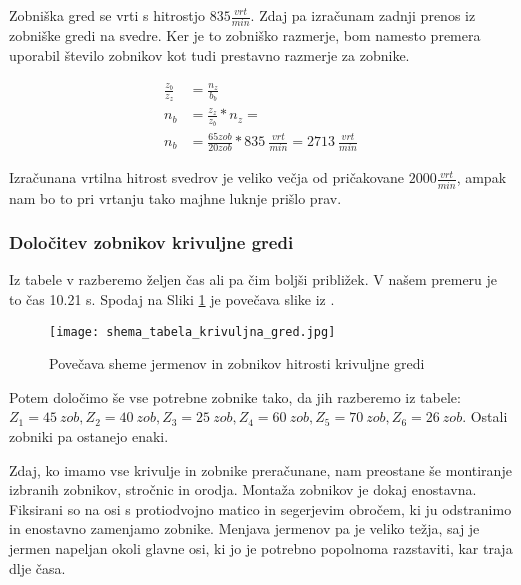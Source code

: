 Zobniška gred se vrti s hitrostjo \(835 \frac{vrt}{min}\). Zdaj pa izračunam
zadnji prenos iz zobniške gredi na svedre. Ker je to zobniško razmerje, bom namesto
premera uporabil število zobnikov kot tudi prestavno razmerje za zobnike.

\begin{equation}
	\label{eq:12}
	\begin{split}
		\frac{z_b}{z_z} &= \frac{n_z}{b_b} \\
		n_b &= \frac{z_z}{z_b} * n_z = \\
		n_b &= \frac{65 zob}{20 zob} * 835\ \frac{vrt}{min} = 2713\ \frac{vrt}{min}
	\end{split}
\end{equation}

Izračunana vrtilna hitrost svedrov je veliko večja od pričakovane \(2000\frac{vrt}{min}\),
ampak nam bo to pri vrtanju tako majhne luknje prišlo prav.

\subsubsection{Določitev zobnikov krivuljne gredi}

Iz tabele v  razberemo željen čas
ali pa čim boljši približek. V našem premeru je to čas 10.21 s.
Spodaj na Sliki \ref{povecava} je povečava slike iz .
\begin{figure}[H]
	\begin{center}
		\texttt{[image: shema\_tabela\_krivuljna\_gred.jpg]}
		\caption{Povečava sheme jermenov in zobnikov
			hitrosti krivuljne gredi
			\cite{gauthier}}
		\label{povecava}
	\end{center}
\end{figure}

Potem določimo še vse potrebne zobnike tako, da jih razberemo iz tabele: \\
\(Z_1 = 45\ zob, Z_2 = 40\ zob, Z_3 = 25\ zob, Z_4 = 60\ zob, Z_5 = 70\ zob, Z_6 = 26\ zob\).
Ostali zobniki pa ostanejo enaki.

Zdaj, ko imamo vse krivulje in zobnike preračunane, nam preostane še montiranje izbranih
zobnikov, stročnic in orodja. Montaža zobnikov je dokaj enostavna.
Fiksirani so na osi s protiodvojno matico in segerjevim obročem,
ki ju odstranimo in enostavno zamenjamo zobnike. Menjava jermenov pa je veliko težja, saj je jermen napeljan okoli glavne osi,
ki jo je potrebno popolnoma razstaviti, kar traja dlje časa.